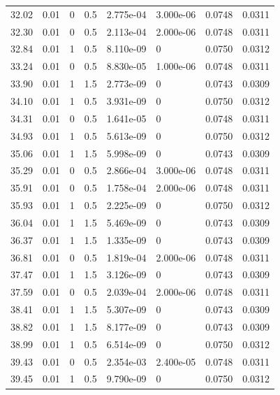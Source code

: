\documentclass[preview]{standalone}
\begin{document}
{{{\begin{tabular}{L{1.2cm}C{1.2cm} C{0.3cm}C{0.5cm} C{1.4cm}C{1.4cm} C{1.4cm}C{1.4cm}}
  32.02  &  0.01  & 0     & 0.5 &  2.775e-04  & 3.000e-06  & 0.0748 &  0.0311   \\ 
  32.30  &  0.01  & 0     & 0.5 &  2.113e-04  & 2.000e-06  & 0.0748 &  0.0311   \\ 
  32.84  &  0.01  & 1     & 0.5 &  8.110e-09  & 0  & 0.0750 &  0.0312   \\ 
  33.24  &  0.01  & 0     & 0.5 &  8.830e-05  & 1.000e-06  & 0.0748 &  0.0311   \\ 
  33.90  &  0.01  & 1     & 1.5 &  2.773e-09  & 0  & 0.0743 &  0.0309   \\ 
  34.10  &  0.01  & 1     & 0.5 &  3.931e-09  & 0  & 0.0750 &  0.0312   \\ 
  34.31  &  0.01  & 0     & 0.5 &  1.641e-05  & 0  & 0.0748 &  0.0311   \\ 
  34.93  &  0.01  & 1     & 0.5 &  5.613e-09  & 0  & 0.0750 &  0.0312   \\ 
  35.06  &  0.01  & 1     & 1.5 &  5.998e-09  & 0  & 0.0743 &  0.0309   \\ 
  35.29  &  0.01  & 0     & 0.5 &  2.866e-04  & 3.000e-06  & 0.0748 &  0.0311   \\ 
  35.91  &  0.01  & 0     & 0.5 &  1.758e-04  & 2.000e-06  & 0.0748 &  0.0311   \\ 
  35.93  &  0.01  & 1     & 0.5 &  2.225e-09  & 0  & 0.0750 &  0.0312   \\ 
  36.04  &  0.01  & 1     & 1.5 &  5.469e-09  & 0  & 0.0743 &  0.0309   \\ 
  36.37  &  0.01  & 1     & 1.5 &  1.335e-09  & 0  & 0.0743 &  0.0309   \\ 
  36.81  &  0.01  & 0     & 0.5 &  1.819e-04  & 2.000e-06  & 0.0748 &  0.0311   \\ 
  37.47  &  0.01  & 1     & 1.5 &  3.126e-09  & 0  & 0.0743 &  0.0309   \\ 
  37.59  &  0.01  & 0     & 0.5 &  2.039e-04  & 2.000e-06  & 0.0748 &  0.0311   \\ 
  38.41  &  0.01  & 1     & 1.5 &  5.307e-09  & 0  & 0.0743 &  0.0309   \\ 
  38.82  &  0.01  & 1     & 1.5 &  8.177e-09  & 0  & 0.0743 &  0.0309   \\ 
  38.99  &  0.01  & 1     & 0.5 &  6.514e-09  & 0  & 0.0750 &  0.0312   \\ 
  39.43  &  0.01  & 0     & 0.5 &  2.354e-03  & 2.400e-05  & 0.0748 &  0.0311   \\ 
  39.45  &  0.01  & 1     & 0.5 &  9.790e-09  & 0  & 0.0750 &  0.0312   \\ 

\end{tabular}}}}
\end{document}
